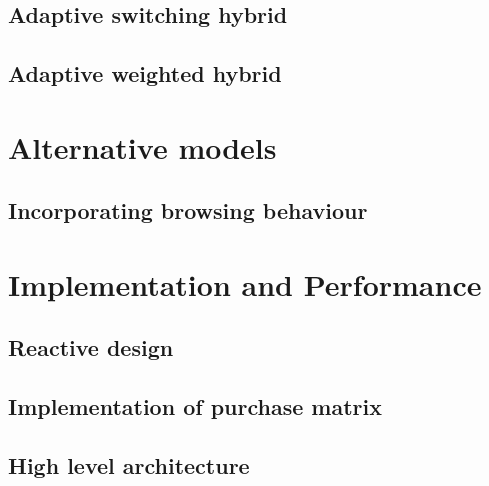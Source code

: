 \documentclass[10pt]{reportMaster}
\begin{document}
\section{Adaptive switching hybrid}


\section{Adaptive weighted hybrid}







\chapter{Alternative models}

\section{Incorporating browsing behaviour}






\chapter{Implementation and Performance}

\section{Reactive design}

\section{Implementation of purchase matrix}

\section{High level architecture}

\end{document}

